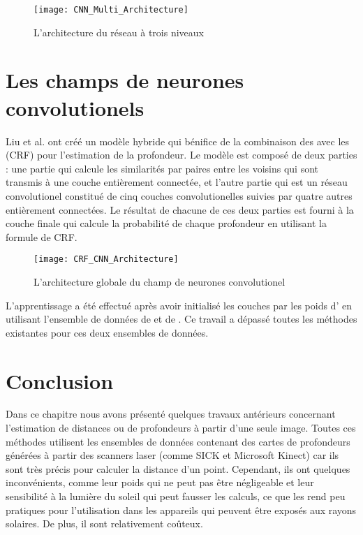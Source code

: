 \vspace{1em}

\begin{figure}[H]
\begin{center}
\texttt{[image: CNN\_Multi\_Architecture]}
\caption{L'architecture du réseau à trois niveaux}
\end{center}
\end{figure}

\section{Les champs de neurones convolutionels}

Liu et al.\cite{liu2015deep} ont créé un modèle hybride qui bénifice de la combinaison
des  avec les  (CRF) pour l'estimation de la profondeur. Le modèle est composé de deux
parties : une partie qui calcule les similarités par paires entre les
 voisins qui sont transmis à une couche entièrement connectée,
et l'autre partie qui est un réseau convolutionel constitué de cinq couches
convolutionelles suivies par quatre autres entièrement connectées. Le résultat
de chacune de ces deux parties est fourni à la couche finale qui calcule la
probabilité de chaque profondeur en utilisant la formule de CRF.

\begin{figure}[H]
\texttt{[image: CRF\_CNN\_Architecture]}
\caption{L'architecture globale du champ de neurones convolutionel}
\end{figure}

L'apprentissage a été effectué après avoir initialisé les couches par les poids
d' en utilisant l'ensemble de données de  et de
. Ce travail a dépassé toutes les méthodes existantes pour
ces deux ensembles de données.

\section{Conclusion}

Dans ce chapitre nous avons présenté quelques travaux antérieurs concernant
l'estimation de distances ou de profondeurs à partir d'une seule image.
Toutes ces méthodes utilisent les ensembles de données contenant des cartes de
profondeurs générées à partir des scanners laser (comme SICK et Microsoft Kinect)
car ils sont très précis pour calculer la distance d'un point.
Cependant, ils ont quelques inconvénients, comme leur poids qui ne peut pas être négligeable
et leur sensibilité à la lumière du soleil qui peut fausser les calculs, ce que
les rend peu pratiques pour l'utilisation dans les appareils qui peuvent être
exposés aux rayons solaires. De plus, il sont relativement coûteux.

